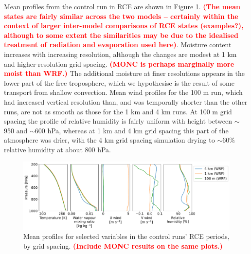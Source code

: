 \documentclass[draft]{agujournal2019}
\newcommand{\todo}[1]{\textcolor{red}{\textbf{(#1)}}}
\begin{document}
Mean profiles from the control run in RCE are shown in Figure
\ref{fig:rce_profiles}. \todo{The mean states are fairly similar across the two
models -- certainly within the context of larger inter-model comparisons of RCE
states (examples?), although to some extent the similarities may be due to the
idealised treatment of radiation and evaporation used here}. Moisture content
increases with increasing resolution, although the changes are modest at 1 km
and higher-resolution grid spacing. \todo{MONC is perhaps marginally more moist
than WRF.} The additional moisture at finer resolutions appears in the lower
part of the free troposphere, which we hypothesise is the result of some
transport from shallow convection. Mean wind profiles for the 100 m run, which
had increased vertical resolution than, and was temporally shorter than the
other runs, are not as smooth as those for the 1 km and 4 km runs. At 100 m grid
spacing the profile of relative humidity is fairly uniform with height between
$\sim$950 and $\sim$600 hPa, whereas at 1 km and 4 km grid spacing this part of
the atmosphere was drier, with the 4 km grid spacing simulation drying to
$\sim$60\% relative humidity at about 800 hPa.

\begin{figure}[pth]
    \noindent\includegraphics[width=\textwidth]{figures/RCE_profiles}
    \caption{Mean profiles for selected variables in the control runs' RCE
    periods, by grid spacing. \todo{Include MONC results on the same plots.}}
    \label{fig:rce_profiles}
\end{figure}
\end{document}
